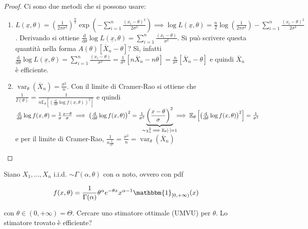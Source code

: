 \documentclass[hidelinks, 10pt]{report}
\DeclareMathOperator{\var}{var}
\begin{document}
\begin{proof}
Ci sono due metodi che si possono usare:
\begin{enumerate}
\item $ L(\underline{x}, \theta) = \left( \frac{1}{2 \pi \sigma^{2}} \right)^{\frac{n}{2}} \exp \left( - \sum\limits_{i = 1}^{n} \frac{(x_{i} - \theta)^{2}}{2 \sigma^{2}} \right) \implies \log L(\underline{x}, \theta) = \frac{n}{2} \log \left( \frac{1}{2 \pi \sigma^{2}} \right) - \sum\limits_{i = 1}^{n} \frac{(x_{i} - \theta)^{2}}{2 \sigma^{2}} $. Derivando si ottiene $ \frac{\mathrm{d}}{\mathrm{d} \theta} \log L(\underline{x}, \theta) = \sum\limits_{i = 1}^{n} \frac{(x_{i} - \theta)}{\sigma^{2}} $. Si pu\`o scrivere questa quantit\`a nella forma $ A(\theta) [\overline{X}_{n} - \theta] $?
S\`i, infatti $ \frac{\mathrm{d}}{\mathrm{d} \theta} \log L(\underline{x}, \theta) = \sum\limits_{i = 1}^{n} \frac{(x_{i} - \theta)}{\sigma^{2}} = \frac{1}{\sigma^{2}} [n \overline{X}_{n} - n \theta] = \frac{n}{\sigma^{2}} [\overline{X}_{n} - \theta] $ e quindi $ \overline{X}_{n} $ \`e efficiente.
\item $ \var_{\theta}(\overline{X}_{n}) = \frac{\sigma^{2}}{n} $. Con il limite di Cramer-Rao si ottiene che $ \frac{1}{I(\theta)} = \frac{1}{n \mathbb{E}_{\theta} \left[ \left( \frac{\mathrm{d}}{\mathrm{d} \theta} \log f(x, \theta) \right)^{2} \right]} $ e quindi $ \frac{\mathrm{d}}{\mathrm{d} \theta} \log f(x, \theta) = \frac{1}{\sigma} \frac{x - \theta}{\sigma} \implies \left( \frac{\mathrm{d}}{\mathrm{d} \theta} \log f(x, \theta) \right)^{2} = \frac{1}{\sigma^{2}} \underbrace{\left( \frac{x - \theta}{\sigma} \right)^{2}}_{\mathclap{\sim \chi^{2}_{1} \implies \mathbb{E}_{\theta} [\cdot] = 1}} \implies \mathbb{E}_{\theta} \left[ \left( \frac{\mathrm{d}}{\mathrm{d} \theta} \log f(x, \theta) \right)^{2} \right] = \frac{1}{\sigma^{2}} $ e per il limite di Cramer-Rao, $ \frac{1}{n \frac{1}{\sigma^{2}}} = \frac{\sigma^{2}}{n} = \var_{\theta}(\overline{X}_{n}) $
\end{enumerate}
\end{proof}

\begin{ex}
Siano $ X_{1}, \dotsc, X_{n} $ i.i.d. $ \sim \Gamma(\alpha, \theta) $ con $ \alpha $ noto, ovvero con pdf

\[ f(x, \theta) = \frac{1}{\Gamma(\alpha)} \theta^{\alpha} e^{- \theta x} x^{\alpha - 1} \mathbbm{1}_{[0, +\infty)} (x) \]

con $ \theta \in (0, +\infty) = \Theta $. Cercare uno stimatore ottimale (UMVU) per $ \theta $. Lo stimatore trovato \`e efficiente?
\end{ex}
\end{document}
